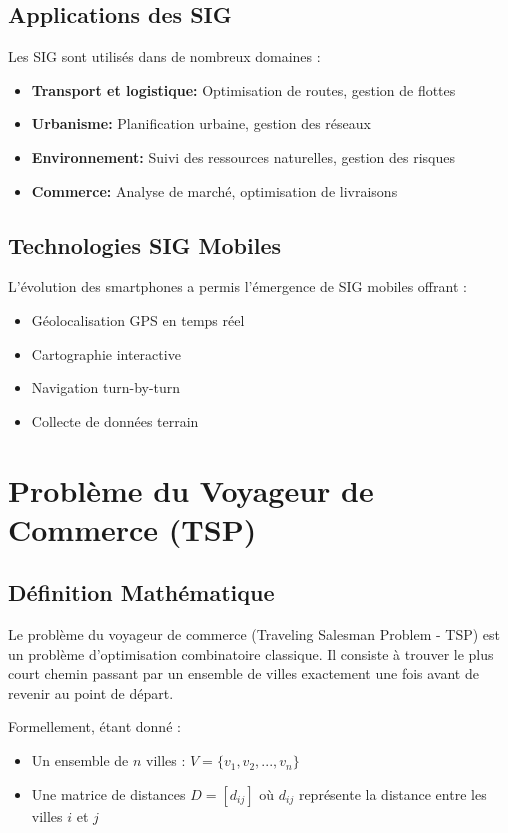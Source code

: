 \documentclass[12pt,a4paper]{report}
\begin{document}
\subsection{Applications des SIG}

Les SIG sont utilisés dans de nombreux domaines :

\begin{itemize}
    \item \textbf{Transport et logistique:} Optimisation de routes, gestion de flottes
    \item \textbf{Urbanisme:} Planification urbaine, gestion des réseaux
    \item \textbf{Environnement:} Suivi des ressources naturelles, gestion des risques
    \item \textbf{Commerce:} Analyse de marché, optimisation de livraisons
\end{itemize}

\subsection{Technologies SIG Mobiles}

L'évolution des smartphones a permis l'émergence de SIG mobiles offrant :

\begin{itemize}
    \item Géolocalisation GPS en temps réel
    \item Cartographie interactive
    \item Navigation turn-by-turn
    \item Collecte de données terrain
\end{itemize}

\section{Problème du Voyageur de Commerce (TSP)}

\subsection{Définition Mathématique}

Le problème du voyageur de commerce (Traveling Salesman Problem - TSP) est un problème d'optimisation combinatoire classique. Il consiste à trouver le plus court chemin passant par un ensemble de villes exactement une fois avant de revenir au point de départ.

Formellement, étant donné :
\begin{itemize}
    \item Un ensemble de $n$ villes : $V = \{v_1, v_2, ..., v_n\}$
    \item Une matrice de distances $D = [d_{ij}]$ où $d_{ij}$ représente la distance entre les villes $i$ et $j$
\end{itemize}
\end{document}
